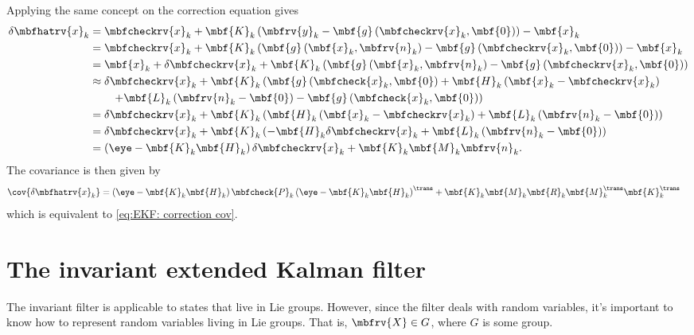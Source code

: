 \documentclass[nobib]{tufte-handout}
\begin{document}
    Applying the same concept on the correction equation gives
    \begin{align}
        \delta\mbfhatrv{x}_{k} 
        &= \mbfcheckrv{x}_{k} + \mbf{K}_{k}\left( \mbfrv{y}_{k} - \mbf{g}\left( \mbfcheckrv{x}_{k}, \mbf{0} \right) \right) - \mbf{x}_{k}\\
        &= \mbfcheckrv{x}_{k} + \mbf{K}_{k}\left( \mbf{g}\left( \mbf{x}_{k},\mbfrv{n}_{k} \right) - \mbf{g}\left( \mbfcheckrv{x}_{k}, \mbf{0} \right) \right) - \mbf{x}_{k}\\
        &= \mbf{x}_{k} + \delta\mbfcheckrv{x}_{k} + \mbf{K}_{k}\left( \mbf{g}\left( \mbf{x}_{k},\mbfrv{n}_{k} \right) - \mbf{g}\left( \mbfcheckrv{x}_{k}, \mbf{0} \right) \right)\\
        &\approx \delta\mbfcheckrv{x}_{k} +\mbf{K}_{k}\left( \mbf{g}\left( \mbfcheck{x}_{k}, \mbf{0} \right) + \mbf{H}_{k}\left( \mbf{x}_{k} - \mbfcheckrv{x}_{k} \right) \right.\nonumber\\&\qquad \left.+ \mbf{L}_{k}\left( \mbfrv{n}_{k}-\mbf{0} \right) - \mbf{g}\left( \mbfcheck{x}_{k},\mbf{0} \right) \right)\\
        &= \delta\mbfcheckrv{x}_{k} +\mbf{K}_{k}\left( \mbf{H}_{k}\left( \mbf{x}_{k} - \mbfcheckrv{x}_{k} \right) + \mbf{L}_{k}\left( \mbfrv{n}_{k}-\mbf{0} \right) \right)\\
        &= \delta\mbfcheckrv{x}_{k} +\mbf{K}_{k}\left( -\mbf{H}_{k}\delta\mbfcheckrv{x}_{k} + \mbf{L}_{k}\left( \mbfrv{n}_{k}-\mbf{0} \right) \right)\\
        &= \left( \eye - \mbf{K}_{k}\mbf{H}_{k} \right)\delta\mbfcheckrv{x}_{k} + \mbf{K}_{k}\mbf{M}_{k}\mbfrv{n}_{k}.
    \end{align}
    The covariance is then given by
    \begin{align}
        \cov{\delta\mbfhatrv{x}_{k}} &= \left( \eye - \mbf{K}_{k}\mbf{H}_{k} \right)\mbfcheck{P}_{k}\left( \eye - \mbf{K}_{k}\mbf{H}_{k} \right)^{\trans} + \mbf{K}_{k}\mbf{M}_{k}\mbf{R}_{k}\mbf{M}_{k}^{\trans}\mbf{K}_{k}^{\trans}
    \end{align}
    which is equivalent to \eqref{eq:EKF: correction cov}.

    \section{The invariant extended Kalman filter}
    The invariant filter\cite{Barrau_Invariant_2018} is applicable to states that live in Lie groups. However, since the filter deals with random variables, it's important to know how to represent random variables living in Lie groups. That is, $\mbfrv{X}\in G$, where $G$ is some group.
\end{document}
